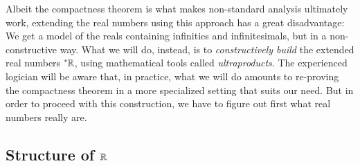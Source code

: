 \documentclass[adraft, copyright,creativecommons,sharealike,noncommercial]{Preambles/eptcs}
\newcommand{\nstar}{{^*}}
\begin{document}
Albeit the compactness theorem is what makes non-standard analysis ultimately work, extending the real numbers using this approach has a great disadvantage: We get a model of the reals containing infinities and infinitesimals, but in a non-constructive way. What we will do, instead, is to \emph{constructively build} the extended real numbers $\nstar \reals$, using mathematical tools called \emph{ultraproducts}. The experienced logician will be aware that, in practice, what we will do amounts to re-proving the compactness theorem in a more specialized setting that suits our need. But in order to proceed with this construction, we have to figure out first what real numbers really are.

\subsection{Structure of $\mathbb{R}$}
\end{document}

